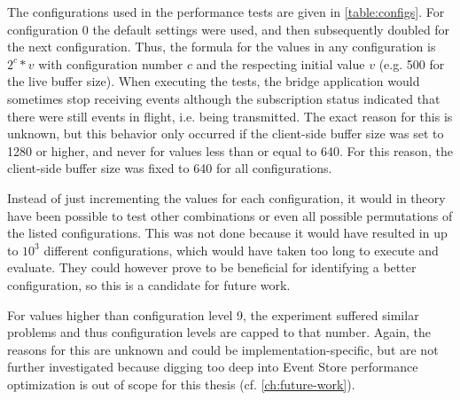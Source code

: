 The configurations used in the performance tests are given in \cref{table:configs}.
For configuration 0 the default settings were used, and then subsequently doubled for the next configuration.
Thus, the formula for the values in any configuration is $ 2^c * v $ with configuration number $c$ and the respecting initial value $v$ (e.g. 500 for the live buffer size).
When executing the tests, the bridge application would sometimes stop receiving events although the subscription status indicated that there were still events in flight, i.e. being transmitted.
The exact reason for this is unknown, but this behavior only occurred if the client-side buffer size was set to 1280 or higher, and never for values less than or equal to 640.
For this reason, the client-side buffer size was fixed to 640 for all configurations.

Instead of just incrementing the values for each configuration, it would in theory have been possible to test other combinations or even all possible permutations of the listed configurations.
This was not done because it would have resulted in up to $10^3$ different configurations, which would have taken too long to execute and evaluate.
They could however prove to be beneficial for identifying a better configuration, so this is a candidate for future work.

For values higher than configuration level 9, the experiment suffered similar problems and thus configuration levels are capped to that number.
Again, the reasons for this are unknown and could be implementation-specific, but are not further investigated because digging too deep into Event Store performance optimization is out of scope for this thesis (cf. \cref{ch:future-work}).

\begin{table}
\caption{Table of all configurations used in the performance tests and their respective settings.}
\centering
{}
\label{table:configs}
\end{table}

